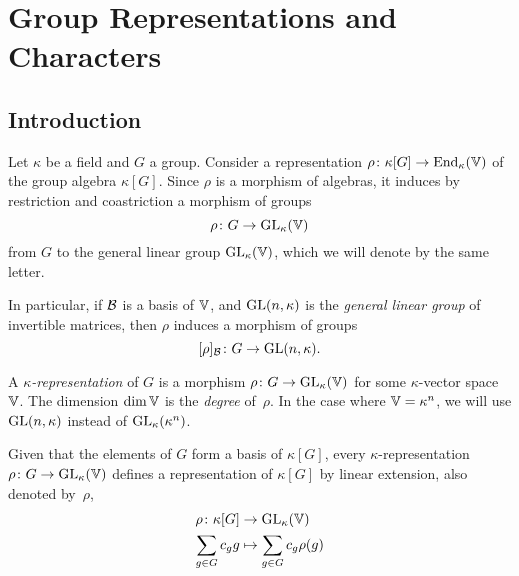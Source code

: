 \chapter{Group Representations and Characters}

\section{Introduction}
Let $\kappa$ be a field and $G$ a group. Consider a representation $\rho\colon\kappa[G]\to{\operatorname{End}}_\kappa(\mathbb V)$ of the group algebra $\kappa[G]$. Since $\rho$ is a morphism of algebras, it induces by restriction and coastriction a morphism of groups
$$
    \rho\colon G\to{\rm GL}_\kappa(\mathbb V)
$$
from $G$ to the general linear group ${\rm GL}_\kappa(\mathbb V)$, which we will denote by the same letter.

In particular, if $\mathcal B$ is a basis of $\mathbb V$, and $\operatorname{GL}(n,\kappa)$ is the \textsl{general linear group} of invertible matrices, then $\rho$ induces a morphism of groups
$$
    [\rho]_{\mathcal B}\colon G\to\operatorname{GL}(n,\kappa).
$$

\begin{defn}
    A \textsl{$\kappa$-representation} of $G$ is a morphism $\rho\colon G\to{\rm GL}_\kappa(\mathbb V)$ for some $\kappa$-vector space $\mathbb V$. The dimension $\dim\mathbb V$ is the \textsl{degree} of~$\rho$. In the case where $\mathbb V=\kappa^n$, we will use $\operatorname{GL}(n,\kappa)$ instead of ${\rm GL}_\kappa(\kappa^n)$.
\end{defn}



\begin{rem}
    Given that the elements of $G$ form a basis of $\kappa[G]$, every $\kappa$-representation $\rho\colon G\to{\rm GL}_\kappa(\mathbb V)$ defines a representation of $\kappa[G]$ by linear extension, also denoted by~$\rho$,
    \begin{align*}
        \rho\colon\kappa[G]&\to{\rm GL}_\kappa(\mathbb V)\\
        \sum_{g\in G}c_gg&\mapsto\sum_{g\in G}c_g\rho(g)
    \end{align*}
\end{rem}

